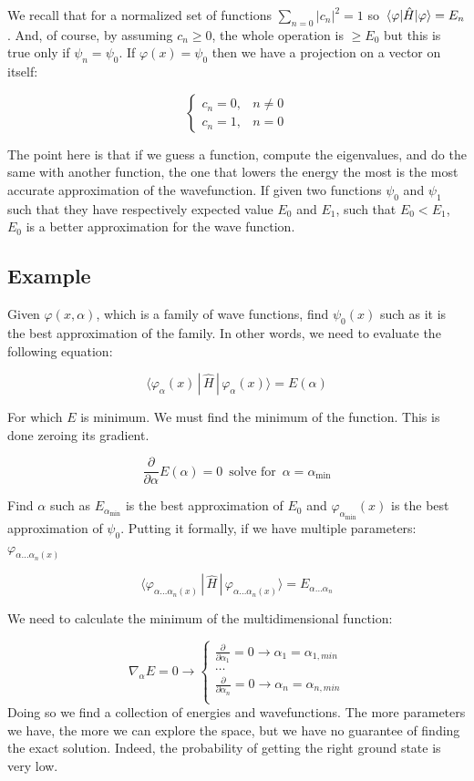 We recall that for a normalized set of functions $\sum_{n=0}|c_n|^2=1$ so $\mel{\varphi}{\hat{H}}{\varphi}=E_n$.
And, of course, by assuming $c_n \geq 0$, the whole operation is $\geq E_0$ but this is true only if $\psi_n=\psi_0$.
If $\varphi(x)=\psi_0$ then we have a projection on a vector on itself:

$$\begin{cases}c_n=0, & n \neq 0\\c_n=1, & n=0\end{cases}$$

The point here is that if we guess a function, compute the eigenvalues, and do the same with another function, the one that lowers the energy the most is the most accurate approximation of the wavefunction.
If given two functions $\psi_0$ and $\psi_1$ such that they have respectively expected value $E_0$ and $E_1$, such that $E_0< E_1$, $E_0$ is a better approximation for the wave function.

	\subsection{Example}
	Given $\varphi(x, \alpha)$, which is a family of wave functions, find $\psi_0(x)$ such as it is the best approximation of the family.
 	In other words, we need to evaluate the following equation:

	$$\langle\varphi_{\alpha}(x)\,|\,\hat{H}\,|\,\varphi_{\alpha}(x)\rangle=E(\alpha)$$

	For which $E$ is minimum.
	We must find the minimum of the function.
	This is done zeroing its gradient.

	$$\frac{\partial}{\partial\alpha}E(\alpha)=0\, \text{  solve for  }\, \alpha=\alpha_{\min}$$

	Find $\alpha$ such as $E_{\alpha_{\min}}$ is the best approximation of $E_0$ and $\varphi_{\alpha_{\min}}(x)$ is the best approximation of $\psi_0$.
	Putting it formally, if we have multiple parameters: $\varphi_{\alpha \dots \alpha_n(x)}$

	$$\langle\varphi_{\alpha \dots \alpha_n(x)}\,|\,\hat{H}\,|\,\varphi_{\alpha \dots \alpha_n(x)}\rangle = E_{\alpha \dots \alpha_n}$$

	We need to calculate the minimum of the multidimensional function:

	$$\nabla_{\alpha}E=0 \rightarrow\begin{cases}\frac{\partial}{\partial \alpha_1}=0 \rightarrow \alpha_1=\alpha_{1, min}\\\dots\\\frac{\partial}{\partial \alpha_n}=0 \rightarrow \alpha_n= \alpha_{n, min}\\\end{cases}$$
	Doing so we find a collection of energies and wavefunctions.
	The more parameters we have, the more we can explore the space, but  we have no guarantee of finding the exact solution.
	Indeed, the probability of getting the right ground state is very low.

